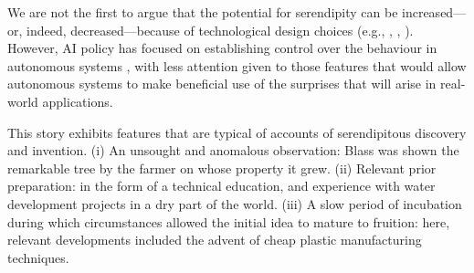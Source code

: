 We are not the first to argue that the potential for
serendipity can be increased---or, indeed, decreased---because of
technological design choices (e.g., \cite{danzico2010design},
\cite{newman2002designing}, \cite{melo2018}).
However, AI policy has focused on establishing control over the
behaviour in autonomous systems \cite{research-priorities}, with less
attention given to those features that would allow autonomous systems
to make beneficial use of the surprises that will arise in real-world
applications.







This story exhibits features that are typical of accounts of serendipitous discovery and invention. (i) An unsought and anomalous observation: Blass was shown the remarkable tree by the farmer on whose property it grew. (ii) Relevant prior preparation: in the form of a technical education, and experience with water development projects in a dry part of the world.  (iii) A slow period of incubation during which circumstances allowed the initial idea to mature to fruition: here, relevant developments included the advent of cheap plastic manufacturing techniques.

